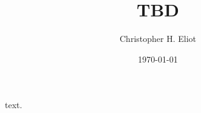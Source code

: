 \documentclass{article}
\title{TBD}
\author{Christopher H. Eliot}
\date{\today}
\begin{document}
text.
\end{document}
